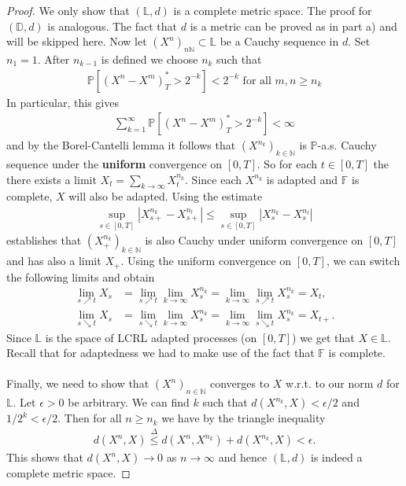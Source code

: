 \documentclass[12pt,a4paper, twoside]{article}
\theoremstyle{definition}
\newcommand{\PP}{\mathbb{P}} %
\begin{document}
\begin{proof}
We only show that $( \mathbb{L},d)$ is a complete metric space. The proof for $( \mathbb{D},d)$ is analogous. The fact that $d$ is a metric can be proved as in part a) and will be skipped here. Now let $(X^n)_{n \mathbb{N}} \subset \mathbb{L}$ be a Cauchy sequence in $d$. Set $n_1=1$. After $n_{k-1}$ is defined we choose $n_k$ such that 
\begin{align*}
\PP[( X^n-X^m)_T^* >2^{-k}] <2^{-k} \text{ for all } m, n \geq n_k
\end{align*}
In particular, this gives 
\begin{align*}
\sum_{k=1}^\infty \PP[( X^n-X^m)_T^* >2^{-k}] < \infty
\end{align*}
and by the Borel-Cantelli lemma it follows that $(X^{n_k})_{k \in \mathbb{N}}$ is $\PP$-a.s. Cauchy sequence under the \textbf{uniform} convergence on $[0,T]$. So for each $t \in [0,T]$ the there exists a limit $X_t= \sum_{k \to \infty} X_t^{n_k}$. Since each $X^{n_k}$ is adapted and $\mathbb{F}$ is complete, $X$ will also be adapted. Using the estimate 
\begin{align*}
\sup_{s \in [0,T]} |X_{s+}^{n_k}-X_{s+}^{n_l}| \leq \sup_{s \in [0,T]} |X_s^{n_k}-X_s^{n_l}|
\end{align*}
establishes that $(X_+^{n_k})_{k \in \mathbb{N}}$ is also Cauchy under uniform convergence on $[0,T]$ and has also a limit $X_+$. Using the uniform convergence on $[0,T]$, we can switch the following limits and obtain
\begin{align*}
\lim_{s \nearrow t} X_s &= \lim_{s \nearrow t} \lim_{k \to \infty} X_s^{n_k} = \lim_{k \to \infty} \lim_{s \nearrow t} X_s^{n_k} = X_t, \\
\lim_{s \searrow t} X_s &= \lim_{s \searrow t} \lim_{k \to \infty} X_s^{n_k}= \lim_{k \to \infty} \lim_{s \searrow t} X_s^{n_k} = X_{t+}.
\end{align*}
Since $\mathbb{L}$ is the space of LCRL adapted processes (on $[0,T]$) we get that $X \in \mathbb{L}$. Recall that for adaptedness we had to make use of the fact that $\mathbb{F}$ is complete. \\
\\
Finally, we need to show that $(X^n)_{n \in \mathbb{N}}$ converges to $X$ w.r.t. to our norm $d$ for $\mathbb{L}$. Let $\epsilon>0$ be arbitrary. We can find $k$ such that $d(X^{n_k},X) < \epsilon/2$ and $1/2^k < \epsilon/2$. Then for all $n \geq n_k$ we have by the triangle inequality
\begin{align*}
d(X^n,X) \overset{\Delta}\leq d(X^n,X^{n_k}) + d(X^{n_k},X) < \epsilon.
\end{align*}
This shows that $d(X^n,X) \to 0$ as $n \to \infty$ and hence $( \mathbb{L},d)$ is indeed a complete metric space. 
\end{proof}
\end{document}
